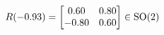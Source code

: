 \documentclass[preview]{standalone}
\begin{document}
\begin{align*}
\special{dvisvgm:raw <g id='unique000'>}R(-0.93) = \begin{bmatrix} 0.60 & 0.80 \\ -0.80 & 0.60 \end{bmatrix} \in \text{SO}(2)\special{dvisvgm:raw </g>}
\end{align*}
\end{document}
